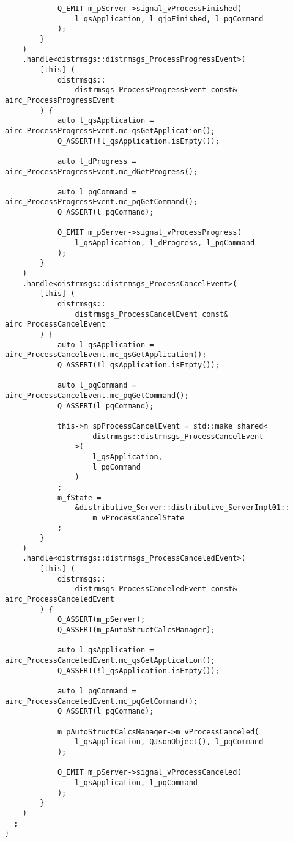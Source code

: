 \begin{verbatim}
            Q_EMIT m_pServer->signal_vProcessFinished(
                l_qsApplication, l_qjoFinished, l_pqCommand
            );
        }
    )
    .handle<distrmsgs::distrmsgs_ProcessProgressEvent>(
        [this] (
            distrmsgs::
                distrmsgs_ProcessProgressEvent const& airc_ProcessProgressEvent
        ) {
            auto l_qsApplication = airc_ProcessProgressEvent.mc_qsGetApplication();
            Q_ASSERT(!l_qsApplication.isEmpty());

            auto l_dProgress =  airc_ProcessProgressEvent.mc_dGetProgress();

            auto l_pqCommand = airc_ProcessProgressEvent.mc_pqGetCommand();
            Q_ASSERT(l_pqCommand);

            Q_EMIT m_pServer->signal_vProcessProgress(
                l_qsApplication, l_dProgress, l_pqCommand
            );
        }
    )
    .handle<distrmsgs::distrmsgs_ProcessCancelEvent>(
        [this] (
            distrmsgs::
                distrmsgs_ProcessCancelEvent const& airc_ProcessCancelEvent
        ) {
            auto l_qsApplication = airc_ProcessCancelEvent.mc_qsGetApplication();
            Q_ASSERT(!l_qsApplication.isEmpty());

            auto l_pqCommand = airc_ProcessCancelEvent.mc_pqGetCommand();
            Q_ASSERT(l_pqCommand);

            this->m_spProcessCancelEvent = std::make_shared<
                    distrmsgs::distrmsgs_ProcessCancelEvent
                >(
                    l_qsApplication,
                    l_pqCommand
                )
            ;
            m_fState = 
                &distributive_Server::distributive_ServerImpl01::
                    m_vProcessCancelState
            ;
        }
    )
    .handle<distrmsgs::distrmsgs_ProcessCanceledEvent>(
        [this] (
            distrmsgs::
                distrmsgs_ProcessCanceledEvent const& airc_ProcessCanceledEvent
        ) {
            Q_ASSERT(m_pServer);
            Q_ASSERT(m_pAutoStructCalcsManager);

            auto l_qsApplication = airc_ProcessCanceledEvent.mc_qsGetApplication();
            Q_ASSERT(!l_qsApplication.isEmpty());

            auto l_pqCommand = airc_ProcessCanceledEvent.mc_pqGetCommand();
            Q_ASSERT(l_pqCommand);

            m_pAutoStructCalcsManager->m_vProcessCanceled(
                l_qsApplication, QJsonObject(), l_pqCommand
            );

            Q_EMIT m_pServer->signal_vProcessCanceled(
                l_qsApplication, l_pqCommand
            );
        }
    )
  ;
}

\end{verbatim}
